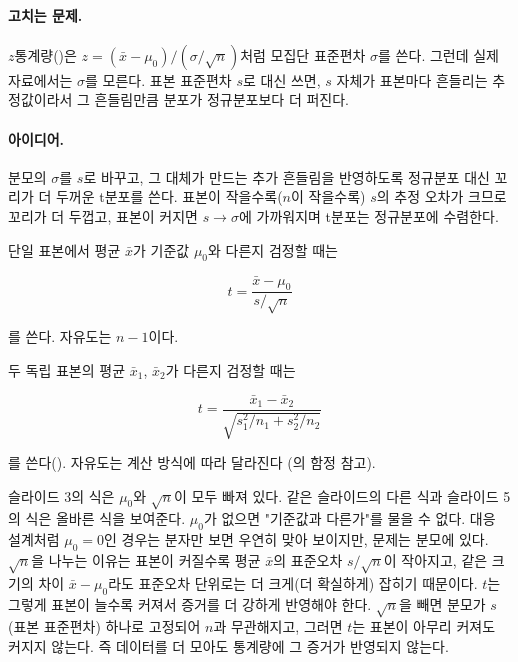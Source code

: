 \paragraph{고치는 문제.} $z$통계량()은
$z = (\bar x - \mu_0)/(\sigma/\sqrt n)$처럼 모집단 표준편차
$\sigma$를 쓴다. 그런데 실제 자료에서는 $\sigma$를 모른다. 표본
표준편차 $s$로 대신 쓰면, $s$ 자체가 표본마다 흔들리는 추정값이라서
그 흔들림만큼 분포가 정규분포보다 더 퍼진다.

\paragraph{아이디어.} 분모의 $\sigma$를 $s$로 바꾸고, 그 대체가
만드는 추가 흔들림을 반영하도록 정규분포 대신 꼬리가 더 두꺼운
t분포를 쓴다. 표본이 작을수록($n$이 작을수록) $s$의 추정 오차가
크므로 꼬리가 더 두껍고, 표본이 커지면 $s \to \sigma$에 가까워지며
t분포는 정규분포에 수렴한다.

\begin{definition}[t통계량]
\label{def:t-statistic}
단일 표본에서 평균 $\bar x$가 기준값 $\mu_0$와 다른지 검정할 때는

\[
  t = \frac{\bar x - \mu_0}{s/\sqrt n}
\]

를 쓴다. 자유도는 $n-1$이다.

두 독립 표본의 평균 $\bar x_1$, $\bar x_2$가 다른지 검정할 때는

\[
  t = \frac{\bar x_1 - \bar x_2}{\sqrt{s_1^2/n_1 + s_2^2/n_2}}
\]

를 쓴다(). 자유도는 계산 방식에 따라 달라진다
(의 함정 참고).
\end{definition}

\begin{pitfall}[슬라이드 값은 $t = \bar x/\bar\sigma$, 다시 계산하면
$t = (\bar x - \mu_0)/(s/\sqrt n)$]
슬라이드 3의 식은 $\mu_0$와 $\sqrt n$이 모두 빠져
있다. 같은 슬라이드의 다른 식과 슬라이드 5의 식은
올바른 식을 보여준다. $\mu_0$가 없으면 "기준값과 다른가"를 물을 수
없다. 대응 설계처럼 $\mu_0 = 0$인 경우는 분자만 보면 우연히 맞아
보이지만, 문제는 분모에 있다. $\sqrt n$을 나누는 이유는 표본이
커질수록 평균 $\bar x$의 표준오차 $s/\sqrt n$이 작아지고, 같은 크기의
차이 $\bar x - \mu_0$라도 표준오차 단위로는 더 크게(더 확실하게)
잡히기 때문이다. $t$는 그렇게 표본이 늘수록 커져서 증거를 더 강하게
반영해야 한다. $\sqrt n$을 빼면 분모가 $s$(표본 표준편차) 하나로
고정되어 $n$과 무관해지고, 그러면 $t$는 표본이 아무리 커져도
커지지 않는다. 즉 데이터를 더 모아도 통계량에 그 증거가 반영되지
않는다.
\end{pitfall}

